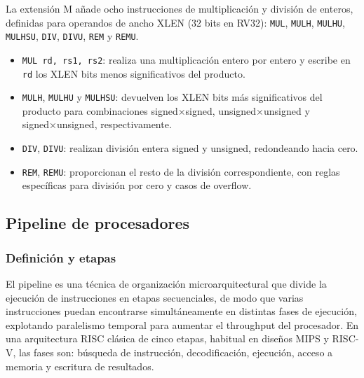La extensión M añade ocho instrucciones de multiplicación y división de enteros, definidas para operandos de ancho XLEN (32 bits en RV32): \texttt{MUL}, \texttt{MULH}, \texttt{MULHU}, \texttt{MULHSU}, \texttt{DIV}, \texttt{DIVU}, \texttt{REM} y \texttt{REMU}.
\begin{itemize}
  \item \texttt{MUL rd, rs1, rs2}: realiza una multiplicación entero por entero y escribe en \texttt{rd} los XLEN bits menos significativos del producto.
  \item \texttt{MULH}, \texttt{MULHU} y \texttt{MULHSU}: devuelven los XLEN bits más significativos del producto para combinaciones signed×signed, unsigned×unsigned y signed×unsigned, respectivamente.
  \item \texttt{DIV}, \texttt{DIVU}: realizan división entera signed y unsigned, redondeando hacia cero.
  \item \texttt{REM}, \texttt{REMU}: proporcionan el resto de la división correspondiente, con reglas específicas para división por cero y casos de overflow.
\end{itemize}


\subsection{Pipeline de procesadores}

\subsubsection{Definición y etapas}

El pipeline es una técnica de organización microarquitectural que divide la ejecución de instrucciones en etapas secuenciales, de modo que varias instrucciones puedan encontrarse simultáneamente en distintas fases de ejecución, explotando paralelismo temporal para aumentar el throughput del procesador. En una arquitectura RISC clásica de cinco etapas, habitual en diseños MIPS y RISC-V, las fases son: búsqueda de instrucción, decodificación, ejecución, acceso a memoria y escritura de resultados.\parencite{Patterson2017Computer,Harris2021Digital}

